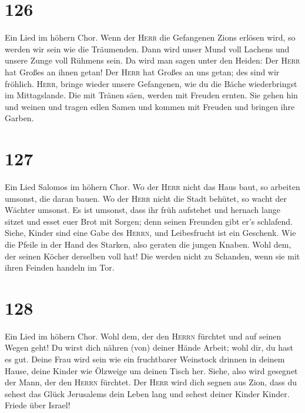 \hypertarget{section-125}{%
\section{126}\label{section-125}}

 Ein Lied im höhern Chor. Wenn der \textsc{Herr} die
Gefangenen Zions erlösen wird, so werden wir sein wie die Träumenden.
 Dann wird unser Mund voll Lachens und unsere Zunge voll
Rühmens sein. Da wird man sagen unter den Heiden: Der \textsc{Herr} hat
Großes an ihnen getan!  Der \textsc{Herr} hat Großes an
uns getan; des sind wir fröhlich.  \textsc{Herr}, bringe
wieder unsere Gefangenen, wie du die Bäche wiederbringst im
Mittagslande.  Die mit Tränen säen, werden mit Freuden
ernten.  Sie gehen hin und weinen und tragen edlen Samen
und kommen mit Freuden und bringen ihre Garben.

\hypertarget{section-126}{%
\section{127}\label{section-126}}

 Ein Lied Salomos im höhern Chor. Wo der \textsc{Herr}
nicht das Haus baut, so arbeiten umsonst, die daran bauen. Wo der
\textsc{Herr} nicht die Stadt behütet, so wacht der Wächter umsonst.
 Es ist umsonst, dass ihr früh aufstehet und hernach lange
sitzet und esset euer Brot mit Sorgen; denn seinen Freunden gibt er's
schlafend.  Siehe, Kinder sind eine Gabe des
\textsc{Herrn}, und Leibesfrucht ist ein Geschenk.  Wie
die Pfeile in der Hand des Starken, also geraten die jungen Knaben.
 Wohl dem, der seinen Köcher derselben voll hat! Die
werden nicht zu Schanden, wenn sie mit ihren Feinden handeln im Tor.

\hypertarget{section-127}{%
\section{128}\label{section-127}}

 Ein Lied im höhern Chor. Wohl dem, der den \textsc{Herrn}
fürchtet und auf seinen Wegen geht!  Du wirst dich nähren
(von) deiner Hände Arbeit; wohl dir, du hast es gut. 
Deine Frau wird sein wie ein fruchtbarer Weinstock drinnen in deinem
Hause, deine Kinder wie Ölzweige um deinen Tisch her. 
Siehe, also wird gesegnet der Mann, der den \textsc{Herrn} fürchtet.
 Der \textsc{Herr} wird dich segnen aus Zion, dass du
sehest das Glück Jerusalems dein Leben lang  und sehest
deiner Kinder Kinder. Friede über Israel!

